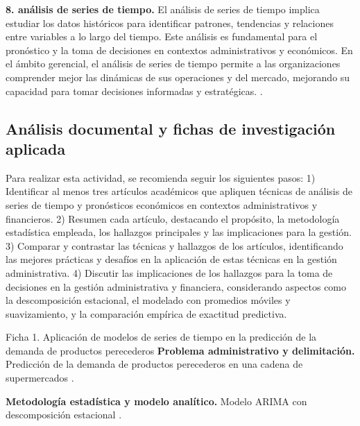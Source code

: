 {\textbf{8. análisis de series de tiempo.} El análisis de series de tiempo implica estudiar los datos históricos para identificar patrones, tendencias y relaciones entre variables a lo largo del tiempo. Este análisis es fundamental para el pronóstico y la toma de decisiones en contextos administrativos y económicos.  En el ámbito gerencial, el análisis de series de tiempo permite a las organizaciones comprender mejor las dinámicas de sus operaciones y del mercado, mejorando su capacidad para tomar decisiones informadas y estratégicas. \citep{anderson2012,lind2012,wackerly2010}.


\subsection{Análisis documental y fichas de investigación aplicada}
Para realizar esta actividad, se recomienda seguir los siguientes pasos: 1) Identificar al menos tres artículos académicos que apliquen técnicas de análisis de series de tiempo y pronósticos económicos en contextos administrativos y financieros. 2) Resumen cada artículo, destacando el propósito, la metodología estadística empleada, los hallazgos principales y las implicaciones para la gestión. 3) Comparar y contrastar las técnicas y hallazgos de los artículos, identificando las mejores prácticas y desafíos en la aplicación de estas técnicas en la gestión administrativa. 4) Discutir las implicaciones de los hallazgos para la toma de decisiones en la gestión administrativa y financiera, considerando aspectos como la descomposición estacional, el modelado con promedios móviles y suavizamiento, y la comparación empírica de exactitud predictiva.

\begin{fichainvestigacion}{Ficha 1. Aplicación de modelos de series de tiempo en la predicción de la demanda de productos perecederos}
\textbf{Problema administrativo y delimitación.} Predicción de la demanda de productos perecederos en una cadena de supermercados \citep{anderson2012,holmesBusiness2023}.

\textbf{Metodología estadística y modelo analítico.} Modelo ARIMA con descomposición estacional \citep{wackerly2010,lind2012}.


\end{fichainvestigacion}}
